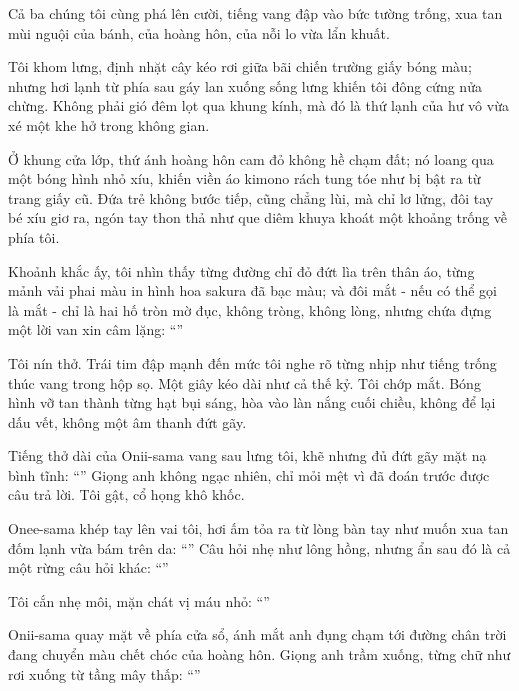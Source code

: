 \documentclass[../main.tex]{subfiles}
\begin{document}
Cả ba chúng tôi cùng phá lên cười, tiếng vang đập vào bức tường trống, xua tan mùi nguội của bánh, của hoàng hôn, của nỗi lo vừa lẩn khuất.

Tôi khom lưng, định nhặt cây kéo rơi giữa bãi chiến trường giấy bóng màu; nhưng hơi lạnh từ phía sau gáy lan xuống sống lưng khiến tôi đông cứng nửa chừng. Không phải gió đêm lọt qua khung kính, mà đó là thứ lạnh của hư vô vừa xé một khe hở trong không gian.

Ở khung cửa lớp, thứ ánh hoàng hôn cam đỏ không hề chạm đất; nó loang qua một bóng hình nhỏ xíu, khiến viền áo kimono rách tung tóe như bị bật ra từ trang giấy cũ. Đứa trẻ không bước tiếp, cũng chẳng lùi, mà chỉ lơ lửng, đôi tay bé xíu giơ ra, ngón tay thon thả như que diêm khuya khoát một khoảng trống về phía tôi.

Khoảnh khắc ấy, tôi nhìn thấy từng đường chỉ đỏ đứt lìa trên thân áo, từng mảnh vải phai màu in hình hoa sakura đã bạc màu; và đôi mắt - nếu có thể gọi là mắt - chỉ là hai hố tròn mờ đục, không tròng, không lòng, nhưng chứa đựng một lời van xin câm lặng: ``''

Tôi nín thở. Trái tim đập mạnh đến mức tôi nghe rõ từng nhịp như tiếng trống thúc vang trong hộp sọ. Một giây kéo dài như cả thế kỷ. Tôi chớp mắt. Bóng hình vỡ tan thành từng hạt bụi sáng, hòa vào làn nắng cuối chiều, không để lại dấu vết, không một âm thanh đứt gãy.

Tiếng thở dài của Onii-sama vang sau lưng tôi, khẽ nhưng đủ đứt gãy mặt nạ bình tĩnh: ``'' Giọng anh không ngạc nhiên, chỉ mỏi mệt vì đã đoán trước được câu trả lời. Tôi gật, cổ họng khô khốc.

Onee-sama khép tay lên vai tôi, hơi ấm tỏa ra từ lòng bàn tay như muốn xua tan đốm lạnh vừa bám trên da: ``'' Câu hỏi nhẹ như lông hồng, nhưng ẩn sau đó là cả một rừng câu hỏi khác: ``''

Tôi cắn nhẹ môi, mặn chát vị máu nhỏ: ``''

Onii-sama quay mặt về phía cửa sổ, ánh mắt anh đụng chạm tới đường chân trời đang chuyển màu chết chóc của hoàng hôn. Giọng anh trầm xuống, từng chữ như rơi xuống từ tầng mây thấp: ``''
\end{document}
